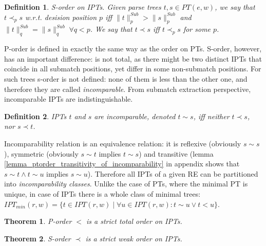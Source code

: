 \documentclass[AMA,STIX1COL]{WileyNJD-v2}
\newcommand{\IPT}{I\!PT}
\newcommand{\snorm}[2]{\|{#1}\|^{Sub}_{#2}}
\newtheorem{Xdef}{Definition}
\newtheorem{XThe}{Theorem}
\begin{document}
    \begin{Xdef}\label{partial_order_on_IPTs}
    \emph{S-order on IPTs.}
    Given parse trees $t, s \in PT(e, w)$, we say that $t \prec_p s$ w.r.t. \emph{desision position} $p$ %
    iff $\snorm{t}{p} > \snorm{s}{p}$ and $\snorm{t}{q} = \snorm{s}{q} \; \forall q < p$.
    We say that $t \prec s$ iff $t \prec_p s$ for some $p$.
    \end{Xdef}

P-order is defined in exactly the same way as the order on PTs.
S-order, however, has an important difference: is not total, as
there might be two distinct IPTs that coincide in all submatch positions, yet differ in some non-submatch positions.
For such trees s-order is not defined: none of them is less than the other one,
and therefore they are called \emph{incomparable}.
From submatch extraction perspective, incomparable IPTs are indistinguishable.

    \begin{Xdef}\label{incomparable_IPTs}
    IPTs $t$ and $s$ are \emph{incomparable}, denoted $t \sim s$,
    iff neither $t \prec s$, nor $s \prec t$.
    \end{Xdef}

Incomparability relation is an equivalence relation: it is
reflexive (obviously $s \sim s$),
symmetric (obviously $s \sim t$ implies $t \sim s$) and
transitive (lemma \ref{lemma_ptorder_transitivity_of_incomparability} in appendix shows that $s \sim t \wedge t \sim u$ implies $s \sim u$).
Therefore all IPTs of a given RE can be partitioned into \emph{incomparability classes}.
%
Unlike the case of PTs, where the minimal PT is unique,
in case of IPTs there is a whole class of minimal trees:
$\IPT_{min}(r,w) = \{ t \in \IPT(r,w) \mid \forall u \in \IPT(r,w) : t \sim u \vee t < u \}$.


    \begin{XThe}\label{theorem_porder_on_IPTs}
    P-order $<$ is a strict total order on IPTs.
    \end{XThe}

    \begin{XThe}\label{theorem_sorder_on_IPTs}
    S-order $\prec$ is a strict weak order on IPTs.
    \end{XThe}
\end{document}
